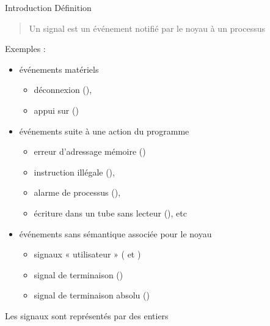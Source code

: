 \def\inc{inc1-7-sig}




\begin {frame} {Introduction}
    Définition
    \begin {quote}
	Un signal est un événement notifié par le noyau à un processus
    \end {quote}

    \vspace* {-2mm}
    
    Exemples :
    \begin {itemize}
	\item événements matériels
	    \begin {itemize}
		\item déconnexion (),
		\item appui sur 
		    ()
	    \end {itemize}
	\item événements suite à une action du programme
	    \begin {itemize}
		\item erreur d'adressage mémoire ()
		\item instruction illégale (),
		\item alarme de processus (),
		\item écriture dans un tube sans lecteur (), etc
	    \end {itemize}
	\item événements sans sémantique associée pour le noyau
	    \begin {itemize}
		\item signaux « utilisateur » ( et
		    )
		\item signal de terminaison ()
		\item signal de terminaison absolu ()
	    \end {itemize}

    \end {itemize}

    Les signaux sont représentés par des entiers \implique {}
\end {frame}

